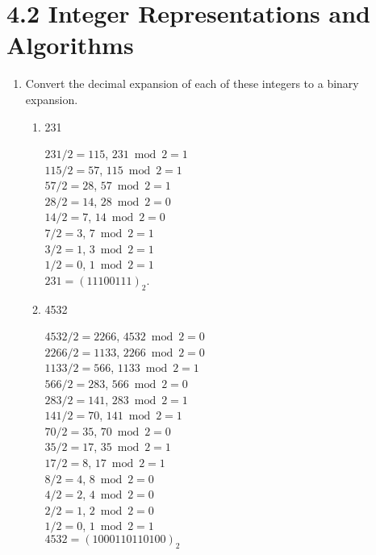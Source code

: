 \documentclass[11pt]{article}
\begin{document}
\pagebreak
\section*{\textbf{4.2 Integer Representations and Algorithms}}
\begin{enumerate}[label=\textbf{\arabic*.}]
	\item Convert the decimal expansion of each of these integers to a binary expansion.
	
	\begin{enumerate}[label=\textbf{\alph*)}]
		\item 231
		
		$231 / 2 = 115$, $231 \bmod 2 = 1$ \\
		$115 / 2 = 57$, $115 \bmod 2 = 1$ \\
		$57 / 2 = 28$, $57 \bmod 2 = 1$ \\
		$28 / 2 = 14$, $28 \bmod 2 = 0$ \\
		$14 / 2 = 7$, $14 \bmod 2 = 0$ \\
		$7 / 2 = 3$, $7 \bmod 2 = 1$ \\
		$3 / 2 = 1$, $3 \bmod 2 = 1$ \\
		$ 1 / 2 = 0$, $1 \bmod 2 = 1$ \\
		
		$231 = (11100111)_2$.
				
		\item 4532
		
		$4532 / 2 = 2266$, $4532 \bmod 2 = 0$ \\
		$2266 / 2 = 1133$, $2266 \bmod 2 = 0$ \\
		$1133 / 2 = 566$, $1133 \bmod 2 = 1$ \\
		$566 / 2 = 283$, $566 \bmod 2 = 0$ \\
		$283 / 2 = 141$, $283 \bmod 2 = 1$ \\
		$141 / 2 = 70$, $141 \bmod 2 = 1$ \\
		$70 / 2 = 35$, $70 \bmod 2 = 0$ \\
		$35 / 2 = 17$, $35 \bmod 2 = 1$ \\
		$17 / 2 = 8$, $17 \bmod 2 = 1$ \\
		$8 / 2 = 4$, $8 \bmod 2 = 0$ \\
		$4 / 2 = 2$, $4 \bmod 2 = 0$ \\
		$2 / 2 = 1$, $2 \bmod 2 = 0$ \\
		$1 / 2 = 0$, $1 \bmod 2 = 1$ \\
		
		$4532 = (1000110110100)_2$
		

\end{enumerate}
\end{enumerate}
\end{document}
